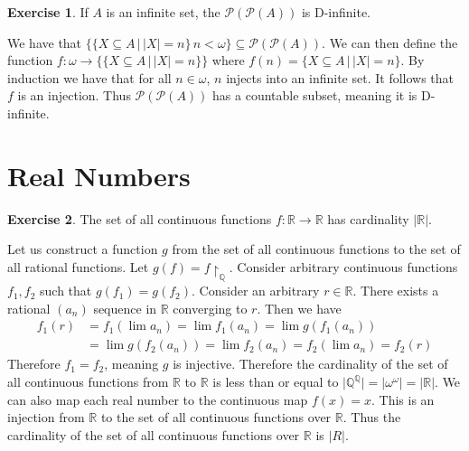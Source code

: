 \documentclass{article}
\theoremstyle{definition}
\newtheorem{exer}{Exercise}[section]
\newcommand{\powset}[1]{\mathcal{P}(#1)}
\newcommand{\Q}{\mathbb{Q}}
\newcommand{\R}{\mathbb{R}}
\newcommand{\abs}[1]{\lvert#1\rvert}
\newlength{\defparindent}
\newenvironment{answer}
    {\begin{mdframed}[backgroundcolor=gray!15, linewidth=0pt] \setlength{\parindent}{\defparindent}}
    {\end{mdframed}}
\begin{document}
\newpage

\begin{exer}
    If $A$ is an infinite set, the $\powset{\powset{A}}$ is D-infinite.
    \begin{answer}
        We have that $\{\{X \subseteq A \, | \, \abs{X} = n \} \, n < \omega \} \subseteq \powset{\powset{A}}$. We can then define the function $f: \omega \to \{\{X \subseteq A \, | \, \abs{X} = n \}\}$ where $f(n) = \{X \subseteq A \, | \, \abs{X} = n \}$. By induction we have that for all $n \in \omega$, $n$ injects into an infinite set. It follows that $f$ is an injection. Thus $\powset{\powset{A}}$ has a countable subset, meaning it is D-infinite.
    \end{answer}
\end{exer}

\section{Real Numbers}

\begin{exer}
    The set of all continuous functions $f: \R \to \R$ has cardinality $\abs{\R}$.
    \begin{answer}
        Let us construct a function $g$ from the set of all continuous functions to the set of all rational functions. Let $g(f) = f\restriction_{\Q}$. Consider arbitrary continuous functions $f_1, f_2$ such that $g(f_1) = g(f_2)$. Consider an arbitrary $r \in \R$. There exists a rational $(a_n)$ sequence in $\R$ converging to $r$. Then we have 
        \begin{align*}    
            f_1(r) & = f_1(\lim a_n) = \lim f_1(a_n) = \lim g(f_1(a_n))
            \\
            & = \lim g(f_2(a_n)) = \lim f_2(a_n) = f_2(\lim a_n) = f_2(r)  
        \end{align*}
        Therefore $f_1 = f_2$, meaning $g$ is injective. Therefore the cardinality of the set of all continuous functions from $\R$ to $\R$ is less than or equal to $\abs{\Q^{\Q}} = \abs{\omega^\omega} = \abs{\R}$. We can also map each real number to the continuous map $f(x) = x$. This is an injection from $\R$ to the set of all continuous functions over $\R$. Thus the cardinality of the set of all continuous functions over $\R$ is $\abs{R}$.
    \end{answer}
\end{exer}
\end{document}
